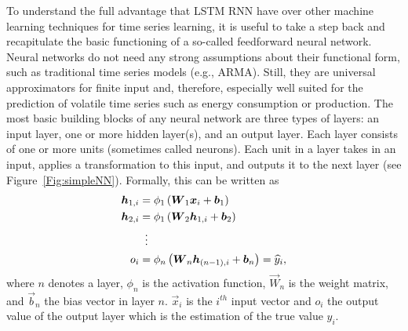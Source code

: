 To understand the full advantage that LSTM RNN have over other machine learning techniques for time series learning, it is useful to take a step back and recapitulate the basic functioning of a so-called feedforward neural network. Neural networks do not need any strong assumptions about their functional form, such as traditional time series models (e.g., ARMA). Still, they are universal approximators for finite input \citep{Hornik:1989} and, therefore, especially well suited for the prediction of volatile time series such as energy consumption or production. The most basic building blocks of any neural network are three types of layers: an input layer, one or more hidden layer(s), and an output layer. Each layer consists of one or more units (sometimes called neurons). Each unit in a layer takes in an input, applies a transformation to this input, and outputs it to the next layer (see Figure~\ref{Fig:simpleNN}). Formally, this can be written as
%
\begin{equation} \label{Eq:feedforward}
\begin{split}
    \vec{h}_{1,i}&=\phi_1\left(\vec{W}_1\vec{x}_i+\vec{b}_1\right)\\
    \vec{h}_{2,i}&=\phi_1\left(\vec{W}_2\vec{h}_{1,i}+\vec{b}_2\right)\\
    &\setbox0\hbox{=}\mathrel{\makebox[\wd0]{\hfil\vdots\hfil}}\\
    o_i&=\phi_n\left(\vec{W}_n\vec{h}_{(n-1),i}+\vec{b}_n\right)=\widehat{y}_i,
\end{split}
\end{equation}
%
where $n$ denotes a layer, $\phi_n$ is the activation function, $\vec{W}_n$ is the weight matrix, and $\vec{b}_n$ the bias vector in layer $n$. $\vec{x}_i$ is the $i^{th}$ input vector and $o_i$ the output value of the output layer which is the estimation of the true value $y_i$.
%
